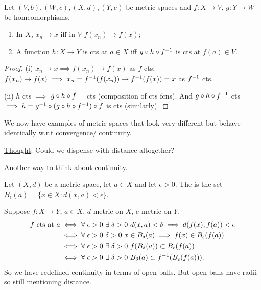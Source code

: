 \begin{proposition}
    Let $(V, b), (W, c), (X, d), (Y, e)$ be metric spaces and $f : X \to V$, $g:Y \to W$ be homeomorphisms.
    \begin{enumerate}
        \item In $X$, $x_n \to x$ iff in $V$ $f(x_n) \to f(x)$;
        \item A function $h: X \to Y$ is cts at $a \in X$ iff $g \circ h \circ f^{-1}$ is cts at $f(a) \in V$.
    \end{enumerate} 
\end{proposition} 

\begin{proof}
    (i) $x_n \to x \implies f(x_n) \to f(x)$ as $f$ cts; $f(x_n) \to f(x) \implies x_n = f^{-1}(f(x_n)) \to f^{-1} (f(x)) = x$ as $f^{-1}$ cts.

    (ii) $h$ cts $\implies$ $g \circ h \circ f^{-1}$ cts (composition of cts fcns).
    And $g \circ h \circ f^{-1}$ cts $\implies h = g^{-1} \circ (g \circ h \circ f^{-1}) \circ f$ is cts (similarly).
\end{proof} 

We now have examples of metric spaces that look very different but behave identically w.r.t convergence/ continuity.

\underline{Thought}: Could we dispense with distance altogether?

Another way to think about continuity.

\begin{definition}
    Let $(X, d)$ be a metric space, let $a \in X$ and let $\epsilon > 0$.
    The  is the set $B_\epsilon(a) = \{ x \in X : d(x, a) < \epsilon\}$.
\end{definition} 

\begin{remark}
    Suppose $f: X \to Y$, $a \in X$.
    $d$ metric on $X$, $e$ metric on $Y$.
    \begin{align*}
        f \text{ cts at } a &\iff \forall \; \epsilon > 0 \ \exists \; \delta > 0 \ d(x, a) < \delta \implies d(f(x), f(a)) < \epsilon \\
        &\iff \forall \; \epsilon > 0 \ \delta > 0 \ x \in B_\delta(a) \implies f(x) \in B_\epsilon(f(a)) \\
        &\iff \forall \; \epsilon > 0 \ \exists \; \delta > 0 \ f(B_\delta(a)) \subset B_\epsilon(f(a)) \\
        &\iff \forall \; \epsilon > 0 \ \exists \; \delta > 0 \ B_\delta(a) \subset f\inv(B_\epsilon(f(a))).
    \end{align*} 
    So we have redefined continuity in terms of open balls.
    But open balls have radii so still mentioning distance.
\end{remark} 

